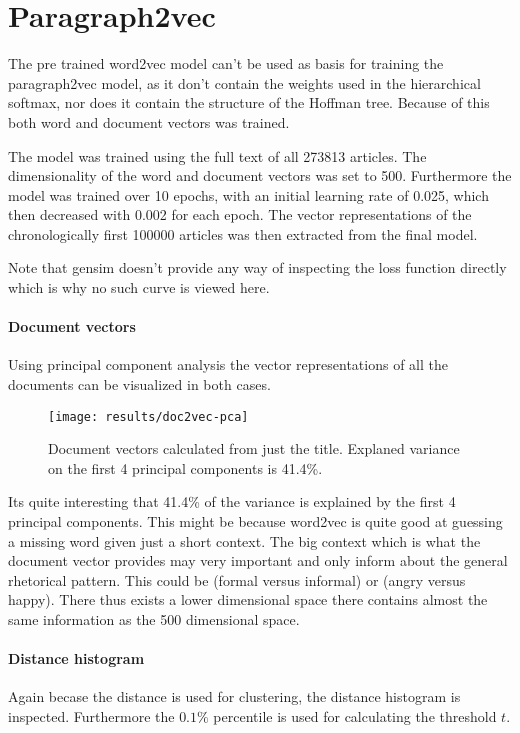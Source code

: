 \section{Paragraph2vec}

The pre trained word2vec model can't be used as basis for training the paragraph2vec model, as it don't contain the weights used in the hierarchical softmax, nor does it contain the structure of the Hoffman tree. Because of this both word and document vectors was trained.

The model was trained using the full text of all 273813 articles. The dimensionality of the word and document vectors was set to 500. Furthermore the model was trained over 10 epochs, with an initial learning rate of 0.025, which then decreased with 0.002 for each epoch. The vector representations of the chronologically first 100000 articles was then extracted from the final model.

Note that gensim doesn't provide any way of inspecting the loss function directly which is why no such curve is viewed here.  

\paragraph{Document vectors} Using principal component analysis the vector representations of all the documents can be visualized in both cases.

\begin{figure}[H]
	\centering
	\texttt{[image: results/doc2vec-pca]}
	\caption{Document vectors calculated from just the title. Explaned variance on the first 4 principal components is 41.4\%.}
\end{figure}

Its quite interesting that 41.4\% of the variance is explained by the first 4 principal components. This might be because word2vec is quite good at guessing a missing word given just a short context. The big context which is what the document vector provides may very important and only inform about the general rhetorical pattern. This could be (formal versus  informal) or (angry versus happy). There thus exists a lower dimensional space there contains almost the same information as the 500 dimensional space.

\paragraph{Distance histogram} Again becase the distance is used for clustering, the distance histogram is inspected. Furthermore the $0.1\%$ percentile is used for calculating the threshold $t$.

